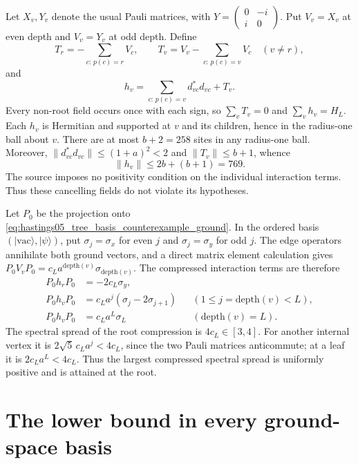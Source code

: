 \documentclass{article}
\newcommand{\vac}{\mathrm{vac}}
\newcommand{\dep}{\mathrm{depth}}
\begin{document}
Let $X_v,Y_v$ denote the usual Pauli matrices, with
$Y=\left(\begin{smallmatrix}0&-i\\i&0\end{smallmatrix}\right)$.
Put $V_v=X_v$ at even depth and $V_v=Y_v$ at odd depth. Define
\[
 T_r=-\sum_{c:\,p(c)=r}V_c,\qquad
 T_v=V_v-\sum_{c:\,p(c)=v}V_c\quad(v\ne r),
\]
and
\begin{equation}
 h_v=\sum_{c:\,p(c)=v}d_{vc}^*d_{vc}+T_v.
 \label{eq:hastings05_tree_basis_counterexample_terms}
\end{equation}
Every non-root field occurs once with each sign, so $\sum_vT_v=0$ and
$\sum_vh_v=H_L$. Each $h_v$ is Hermitian and supported at $v$ and its
children, hence in the radius-one ball about $v$. There are at most
$b+2=258$ sites in any radius-one ball. Moreover,
$\|d_{vc}^*d_{vc}\|\le(1+a)^2<2$ and $\|T_v\|\le b+1$, whence
\[
 \|h_v\|\le2b+(b+1)=769.
\]
The source imposes no positivity condition on the individual interaction
terms. Thus these cancelling fields do not violate its hypotheses.

Let $P_0$ be the projection onto \eqref{eq:hastings05_tree_basis_counterexample_ground}.
In the ordered basis $(|\vac\rangle,|\psi\rangle)$, put
$\sigma_j=\sigma_x$ for even $j$ and $\sigma_j=\sigma_y$ for odd $j$.
The edge operators annihilate both ground vectors, and a direct matrix
element calculation gives
$P_0V_vP_0=c_La^{\dep(v)}\sigma_{\dep(v)}$.
The compressed interaction terms are therefore
\begin{align}
 P_0h_rP_0&=-2c_L\sigma_y,\label{eq:hastings05_tree_basis_counterexample_root}\\
 P_0h_vP_0&=c_La^j(\sigma_j-2\sigma_{j+1})
       &&(1\le j=\dep(v)<L),\label{eq:hastings05_tree_basis_counterexample_internal}\\
 P_0h_vP_0&=c_La^L\sigma_L
       &&(\dep(v)=L).\label{eq:hastings05_tree_basis_counterexample_leaf}
\end{align}
The spectral spread of the root compression is $4c_L\in[3,4]$.
For another internal vertex it is $2\sqrt5\,c_La^j<4c_L$, since
the two Pauli matrices anticommute; at a leaf it is $2c_La^L<4c_L$.
Thus the largest compressed spectral spread is uniformly positive and
is attained at the root.

\section{The lower bound in every ground-space basis}
\end{document}
